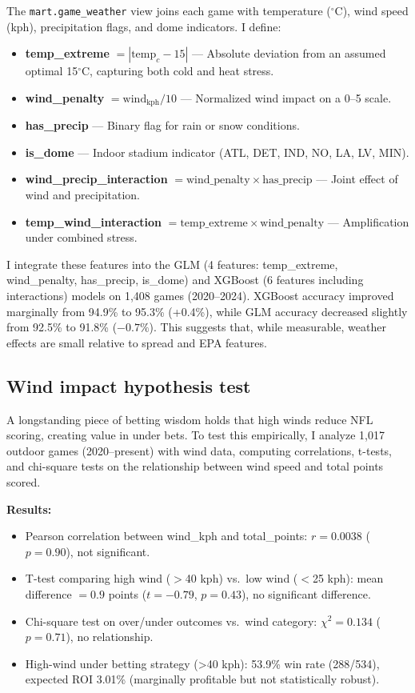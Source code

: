 The \texttt{mart.game\_weather} view joins each game with temperature ($^\circ$C), wind speed (kph), precipitation flags, and dome indicators. I define:
\begin{itemize}
  \item \textbf{temp\_extreme} $= |\text{temp}_c - 15|$ — Absolute deviation from an assumed optimal 15$^\circ$C, capturing both cold and heat stress.
  \item \textbf{wind\_penalty} $= \text{wind}_\text{kph} / 10$ — Normalized wind impact on a 0--5 scale.
  \item \textbf{has\_precip} — Binary flag for rain or snow conditions.
  \item \textbf{is\_dome} — Indoor stadium indicator (ATL, DET, IND, NO, LA, LV, MIN).
  \item \textbf{wind\_precip\_interaction} $= \text{wind\_penalty} \times \text{has\_precip}$ — Joint effect of wind and precipitation.
  \item \textbf{temp\_wind\_interaction} $= \text{temp\_extreme} \times \text{wind\_penalty}$ — Amplification under combined stress.
\end{itemize}

I integrate these features into the GLM (4 features: temp\_extreme, wind\_penalty, has\_precip, is\_dome) and XGBoost (6 features including interactions) models on 1,408 games (2020--2024). XGBoost accuracy improved marginally from 94.9\% to 95.3\% (+0.4\%), while GLM accuracy decreased slightly from 92.5\% to 91.8\% ($-0.7\%$). This suggests that, while measurable, weather effects are small relative to spread and EPA features.

\subsection{Wind impact hypothesis test}\label{subsec:wind-hypothesis}
A longstanding piece of betting wisdom holds that high winds reduce NFL scoring, creating value in under bets. To test this empirically, I analyze 1,017 outdoor games (2020--present) with wind data, computing correlations, t-tests, and chi-square tests on the relationship between wind speed and total points scored.

\textbf{Results:}
\begin{itemize}
  \item Pearson correlation between wind\_kph and total\_points: $r = 0.0038$ ($p = 0.90$), not significant.
  \item T-test comparing high wind ($>$40 kph) vs.\ low wind ($<$25 kph): mean difference $= 0.9$ points ($t = -0.79$, $p = 0.43$), no significant difference.
  \item Chi-square test on over/under outcomes vs.\ wind category: $\chi^2 = 0.134$ ($p = 0.71$), no relationship.
  \item High-wind under betting strategy (>40 kph): 53.9\% win rate (288/534), expected ROI 3.01\% (marginally profitable but not statistically robust).
\end{itemize}

